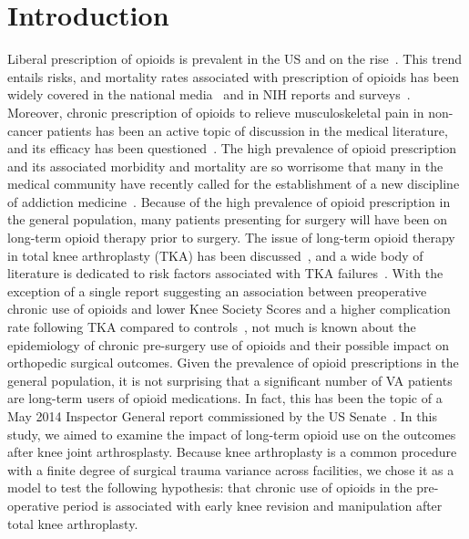 \documentclass[a4paper]{article}
\begin{document}
\section*{Introduction}
Liberal prescription of opioids is prevalent in the US and on the rise~\cite{pmid22786464}. This trend entails risks, and mortality rates associated with prescription of opioids has been widely covered in the national media~\cite{WSJ,SeattleTimes} and in NIH reports and surveys~\cite{pmid22048730,pmid21734633,pmid19875978,pmid22786464}. Moreover, chronic prescription of opioids to relieve musculoskeletal pain in non-cancer patients has been an active topic of discussion in the medical literature, and its efficacy has been questioned~\cite{pmid23371480,pmid23363517,pmid22843539}. The high prevalence of opioid prescription and  its associated morbidity and mortality are so worrisome that many in the medical community have recently called for the establishment of a new discipline of addiction medicine~\cite{pmid25201642}.
Because of the high prevalence of opioid prescription in the general population, many patients
 presenting for surgery will have been on long-term opioid therapy prior to surgery. The issue of long-term opioid therapy in total knee arthroplasty (TKA) has been discussed~\cite{pmid25281256,pmid19910619, pmid14612477}, and a wide body of literature is dedicated to risk factors associated with TKA failures~\cite{pmid24944970,pmid21822665}.  
 With the exception of a single report suggesting an association between preoperative chronic use of opioids and lower Knee Society Scores and a higher complication rate following TKA compared to controls~\cite{pmid22048093,pmid22048108}, not much is known about the epidemiology of chronic pre-surgery use of opioids and their possible impact on orthopedic surgical outcomes.
Given the prevalence of opioid prescriptions in the general population, it is not surprising that a significant number of VA patients are long-term users of opioid medications. In fact, this  has been the topic of a May 2014 Inspector General report commissioned by the US Senate~\cite{VAOpioids}.
In this study, we aimed to examine the impact of long-term opioid use on the outcomes after knee joint arthrosplasty. Because knee arthroplasty is a common
 procedure with a finite degree of surgical trauma variance across facilities, we chose it as a model to test the following hypothesis: that chronic use of opioids in the pre-operative period is associated with early knee revision and manipulation after total knee arthroplasty.
\end{document}
